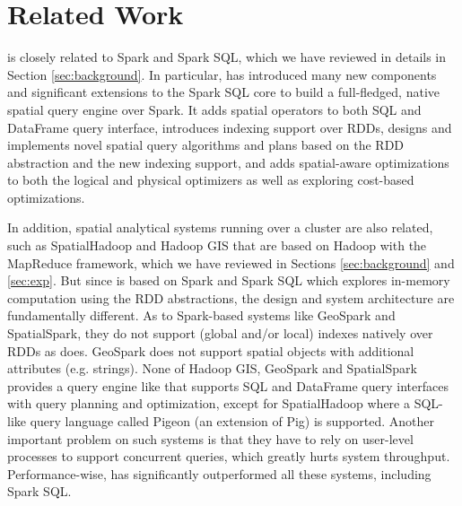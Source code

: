 \section{Related Work}
\label{sec:related}

\name is closely related to Spark and Spark SQL, which we have
reviewed in details in Section \ref{sec:background}. In particular,
\name has introduced many new components and significant extensions to
the Spark SQL core to build a full-fledged, native spatial query
engine over Spark. It adds spatial operators to both SQL and DataFrame
query interface, introduces indexing support over RDDs, designs and
implements novel spatial query algorithms and plans based on the RDD
abstraction and the new indexing support, and adds spatial-aware
optimizations to both the logical and physical optimizers as well as
exploring cost-based optimizations.


In addition, spatial analytical systems running over a cluster are
also related, such as SpatialHadoop \cite{spatialhadoop} and Hadoop
GIS \cite{hadoopgis} that are based on Hadoop with the MapReduce
framework, which we have reviewed in Sections \ref{sec:background} and
\ref{sec:exp}. But since \name is based on Spark and Spark SQL which
explores in-memory computation using the RDD abstractions, the design
and system architecture are fundamentally different. As to Spark-based
systems like GeoSpark\cite{geospark} and SpatialSpark\cite{spatialspark},
they do not support (global and/or local) indexes natively over RDDs
as \name does. GeoSpark does not support spatial objects with additional
attributes (e.g. strings). None of Hadoop GIS, GeoSpark and SpatialSpark
provides a query engine like \name that supports SQL and DataFrame query
interfaces with query planning and optimization, except for SpatialHadoop
where a SQL-like query language called Pigeon (an extension of Pig\cite{pig})
is supported. Another important problem on such systems is that they
have to rely on user-level processes to support concurrent queries, which
greatly hurts system throughput. Performance-wise, \name has significantly
outperformed all these systems, including Spark SQL. 

